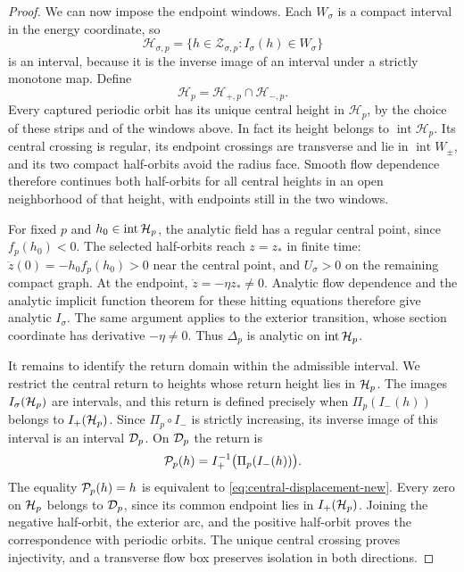 \begin{proof}
We can now impose the endpoint windows. Each $W_\sigma$ is a compact
interval in the energy coordinate, so
\[
 \mathcal H_{\sigma,p}
 =\{h\in\mathcal Z_{\sigma,p}:I_\sigma(h)\in W_\sigma\}
\]
is an interval, because it is the inverse image of an interval under a
strictly monotone map.  Define
\[
 \mathcal H_p=\mathcal H_{+,p}\cap\mathcal H_{-,p}.
\]
Every captured periodic orbit has its unique central height in
$\mathcal H_p$, by the choice of these strips and of the windows above.
In fact its height belongs to \(\operatorname{int}\mathcal H_p\).
Its central crossing is regular, its endpoint crossings are transverse
and lie in \(\operatorname{int}W_\pm\), and its two compact half-orbits
avoid the radius face. Smooth flow dependence therefore continues
both half-orbits for all central heights in an open neighborhood
of that height, with endpoints still in the two windows.

For fixed \(p\) and \(h_0\in\operatorname{int}\mathcal H_p\), the
analytic field has a regular central point, since \(f_p(h_0)<0\).
The selected half-orbits reach \(z=z_*\) in finite time:
\(\ddot z(0)=-h_0f_p(h_0)>0\) near the central point, and
\(U_\sigma>0\) on the remaining compact graph. At the endpoint,
\(\dot z=-\eta z_*\ne0\). Analytic flow dependence and the analytic
implicit function theorem for these hitting equations therefore give
analytic \(I_\sigma\). The same argument applies to the exterior
transition, whose section coordinate has derivative \(-\eta\ne0\).
Thus \(\Delta_p\) is analytic on \(\operatorname{int}\mathcal H_p\).

It remains to identify the return domain within the admissible interval.
We restrict the central return to heights whose return height lies in
$\mathcal H_p$. The images $I_\sigma(\mathcal H_p)$ are intervals, and this return is defined
precisely when $\Pi_p(I_-(h))$ belongs to $I_+(\mathcal H_p)$. Since $\Pi_p\circ I_-$
is strictly increasing, its inverse image of this interval is an interval
$\mathcal D_p$.  On $\mathcal D_p$ the return is
\[
 \mathcal P_p(h)=I_+^{-1}\bigl(\Pi_p(I_-(h))\bigr).
\]
The equality $\mathcal P_p(h)=h$ is equivalent to
\eqref{eq:central-displacement-new}. Every zero on $\mathcal H_p$ belongs to
$\mathcal D_p$, since its common endpoint lies
in $I_+(\mathcal H_p)$.  Joining the negative half-orbit, the exterior arc, and the
positive half-orbit proves the correspondence with periodic orbits.  The
unique central crossing proves injectivity, and a transverse flow box
preserves isolation in both directions.
\end{proof}

